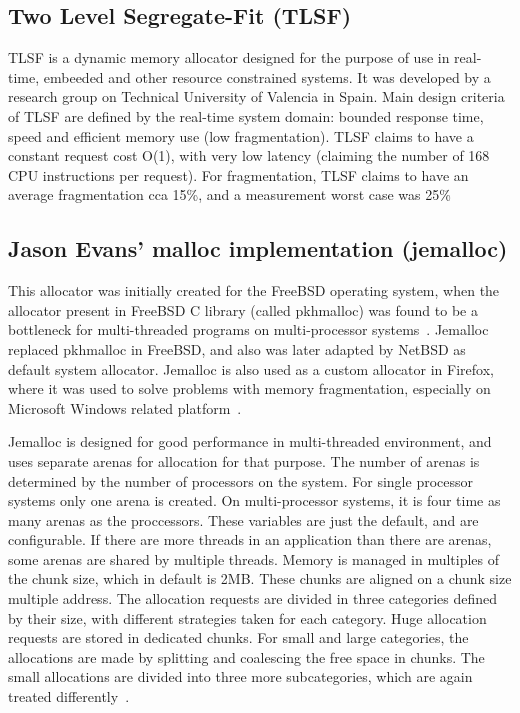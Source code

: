 \subsection{Two Level Segregate-Fit (TLSF)}
TLSF is a dynamic memory allocator designed for the purpose of use in
real-time, embeeded and other resource constrained systems. It was developed by
a research group on Technical University of Valencia in Spain. Main design
criteria of TLSF are defined by the real-time system domain: bounded response
time, speed and efficient memory use (low fragmentation). TLSF claims to have a
constant request cost O(1), with very low latency (claiming the number of 168
CPU instructions per request). For fragmentation, TLSF claims to have an average
fragmentation cca 15\%, and a measurement worst case was 25\%~\cite{allocators:tlsf, allocators:tlsf2}

\subsection{Jason Evans' malloc implementation (jemalloc)}
This allocator was initially created for the FreeBSD operating system, when the allocator present in FreeBSD C library (called pkhmalloc) was found to be a bottleneck for multi-threaded programs on multi-processor systems~\cite{allocators:jemalloc}. Jemalloc replaced pkhmalloc in FreeBSD, and also was later adapted by NetBSD as default system allocator. Jemalloc is also used as a custom allocator in Firefox, where it was used to solve problems with memory fragmentation, especially on Microsoft Windows related platform~\cite{allocators:jemalloc:web}.

Jemalloc is designed for good performance in multi-threaded environment, and uses separate arenas for allocation for that purpose. The number of arenas is determined by the number of processors on the system. For single processor systems only one arena is created. On multi-processor systems, it is four time as many arenas as the proccessors. These variables are just the default, and are configurable. If there are more threads in an application than there are arenas, some arenas are shared by multiple threads. Memory is managed in multiples of the chunk size, which in default is 2MB. These chunks are aligned on a chunk size multiple address. The allocation requests are divided in three categories defined by their size, with different strategies taken for each category. Huge allocation requests are stored in dedicated chunks. For small and large categories, the allocations are made by splitting and coalescing the free space in chunks. The small allocations are divided into three more subcategories, which are again treated differently~\cite{allocators:jemalloc}.

